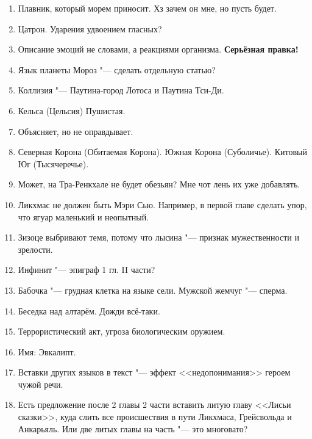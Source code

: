 \documentclass[a4paper,10pt,fleqn]{book}
\begin{document}
\begin{enumerate}
\item Плавник, который морем приносит.
Хз зачем он мне, но пусть будет.

\item Цатрон.
Ударения удвоением гласных?

\item Описание эмоций не словами, а реакциями организма.
\textbf{Серьёзная правка!}

\item Язык планеты Мороз "--- сделать отдельную статью?

\item Коллизия "--- Паутина-город Лотоса и Паутина Тси-Ди.

\item Кельса (Цельсия) Пушистая.

\item Объясняет, но не оправдывает.

\item Северная Корона (Обитаемая Корона).
Южная Корона (Суболичье).
Китовый Юг (Тысячеречье).

\item Может, на Тра-Ренкхале не будет обезьян?
Мне чот лень их уже добавлять.

\item Ликхмас не должен быть Мэри Сью.
Например, в первой главе сделать упор, что ягуар маленький и неопытный.

\item Зизоце выбривают темя, потому что лысина "--- признак мужественности и зрелости.

\item Инфинит "--- эпиграф 1 гл. II части?

\item Бабочка "--- грудная клетка на языке сели.
Мужской жемчуг "--- сперма.

\item Беседка над алтарём.
Дожди всё-таки.

\item Террористический акт, угроза биологическим оружием.

\item Имя: Эвкалипт.

\item Вставки других языков в текст "--- эффект <<недопонимания>> героем чужой речи.

\item Есть предложение после 2 главы 2 части вставить литую главу <<Лисьи сказки>>, куда слить все происшествия в пути Ликхмаса, Грейсвольда и Анкарьяль.
Или две литых главы на часть "--- это многовато?


\end{enumerate}
\end{document}
